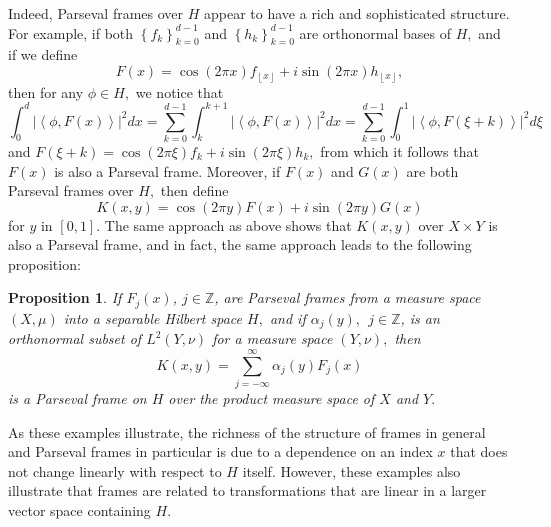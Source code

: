 \documentclass{article}
\newtheorem{prop}[defn]{Proposition}
\begin{document}
Indeed, Parseval frames over $H$ appear to have a rich and sophisticated structure. For example, if both $\left\{ f_{k}\right\} _{k=0}^{d-1}$ and $\left\{ h_{k}\right\} _{k=0}^{d-1}$ are orthonormal bases of $H,$ and if we define 
$$
F\left( x\right) =\cos \left( 2\pi x\right) f_{\left\lfloor x\right\rfloor}+i\sin \left( 2\pi x\right) h_{\left\lfloor x\right\rfloor },
$$
then for any $\phi \in H,$ we notice that 
$$
\int_{0}^{d}\left\vert \left\langle \phi ,F\left( x\right) \right\rangle
\right\vert ^{2}dx=\sum_{k=0}^{d-1}\int_{k}^{k+1}\left\vert \left\langle
\phi ,F\left( x\right) \right\rangle \right\vert
^{2}dx=\sum_{k=0}^{d-1}\int_{0}^{1}\left\vert \left\langle \phi ,F\left( \xi
+k\right) \right\rangle \right\vert ^{2}d\xi 
$$
and 
$F\left( \xi +k\right) =\cos \left( 2\pi \xi \right) f_{k}+i\sin \left(2\pi \xi \right) h_{k},$
from which it follows that $F\left( x\right) $ is also a Parseval frame. Moreover, if $F\left( x\right) $ and $G\left(x\right) $ are both Parseval frames over $H,$ then define 
$$
K\left( x,y\right) = \cos \left( 2\pi y\right) F\left( x\right) +i\sin \left(
2\pi y\right) G\left( x\right) 
$$%
for $y$ in $[0,1].$ The same approach as above shows that $K\left(x,y\right)$ over $X\times Y$ is also a Parseval frame, and in fact, the same approach leads to the following proposition:

\begin{prop}
If $F_{j}\left( x\right) $, $j\in \mathbb{Z}$, are Parseval frames from a measure space $\left( X,\mu \right) $ into a separable Hilbert space $H,$ and if 
$\alpha _{j}\left( y\right) ,\ \ j\in \mathbb{Z}$, 
is an orthonormal subset of $L^{2}\left( Y,\nu \right) $ for a measure space $\left( Y,\nu \right) ,$ then 
$$
K\left( x,y\right) =\sum_{j=-\infty }^{\infty }\alpha _{j}\left( y\right) F_{j}\left( x\right) 
$$
is a Parseval frame on $H$ over the product measure space of $X$ and $Y.$  
\end{prop}

As these examples illustrate, the richness of the structure of frames in general and Parseval frames in particular is due to a dependence on an index $x$ that does not change linearly with respect to $H$ itself. However, these examples also illustrate that frames are related to transformations that are linear in a larger vector space containing $H.$ 
\end{document}
